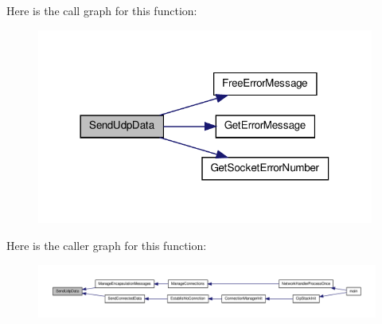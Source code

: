 \-Here is the call graph for this function\-:
\nopagebreak
\begin{figure}[H]
\begin{center}
\leavevmode
\includegraphics[width=314pt]{d5/dc5/group__CIP__CALLBACK__API_gad1d5f56b277bf8b4ffc431e5b0523518_cgraph}
\end{center}
\end{figure}




\-Here is the caller graph for this function\-:
\nopagebreak
\begin{figure}[H]
\begin{center}
\leavevmode
\includegraphics[width=350pt]{d5/dc5/group__CIP__CALLBACK__API_gad1d5f56b277bf8b4ffc431e5b0523518_icgraph}
\end{center}
\end{figure}


